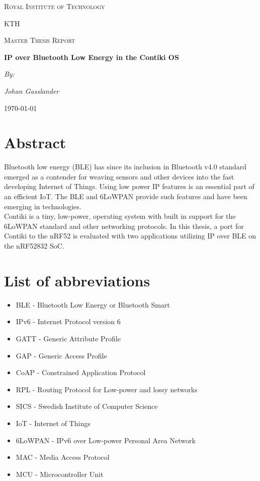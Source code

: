 \documentclass{article}
\begin{document}
\begin{titlepage}
	\centering
	{\scshape\LARGE Royal Institute of Technology \par}
    {\scshape\LARGE KTH \par}
	\vspace{2cm}
	{\scshape\Large Master Thesis Report \par}
	\vspace{1.5cm}
	{\huge\bfseries IP over Bluetooth Low Energy in the Contiki OS
 \par}
	\vspace{3cm}
    {\Large\itshape By:\par}
    \vspace{1cm}
	{\Large\itshape Johan Gasslander\par}
	\vfill
\cleanlookdateon
	{\large \today}
\end{titlepage}

\section*{Abstract}
Bluetooth low energy (BLE) has since its inclusion in Bluetooth v4.0 standard emerged as a contender for weaving sensors and other devices into the fast developing Internet of Things. Using low power IP features is an essential part of an efficient IoT. The BLE and 6LoWPAN provide such features and have been emerging in technologies.\\
Contiki is a tiny, low-power, operating system with built in support for the 6LoWPAN standard and other networking protocols. In this thesis, a port for Contiki to the nRF52 is evaluated with two applications utilizing IP over BLE on the nRF52832 SoC.
\newpage

\section*{List of abbreviations} 
\begin{itemize}
\item 
BLE - Bluetooth Low Energy or Bluetooth Smart
\item 
IPv6	 - Internet Protocol version 6
\item 
GATT - Generic Attribute Profile
\item 
GAP - Generic Access Profile
\item 
CoAP - Constrained Application Protocol
\item 
RPL - Routing Protocol for Low-power and lossy networks
\item 
SICS - Swedish Institute of Computer Science
\item 
IoT - Internet of Things
\item 
6LoWPAN - IPv6 over Low-power Personal Area Network
\item 
MAC - Media Access Protocol
\item 
MCU - Microcontroller Unit
\end{itemize}
\newpage
\end{document}
